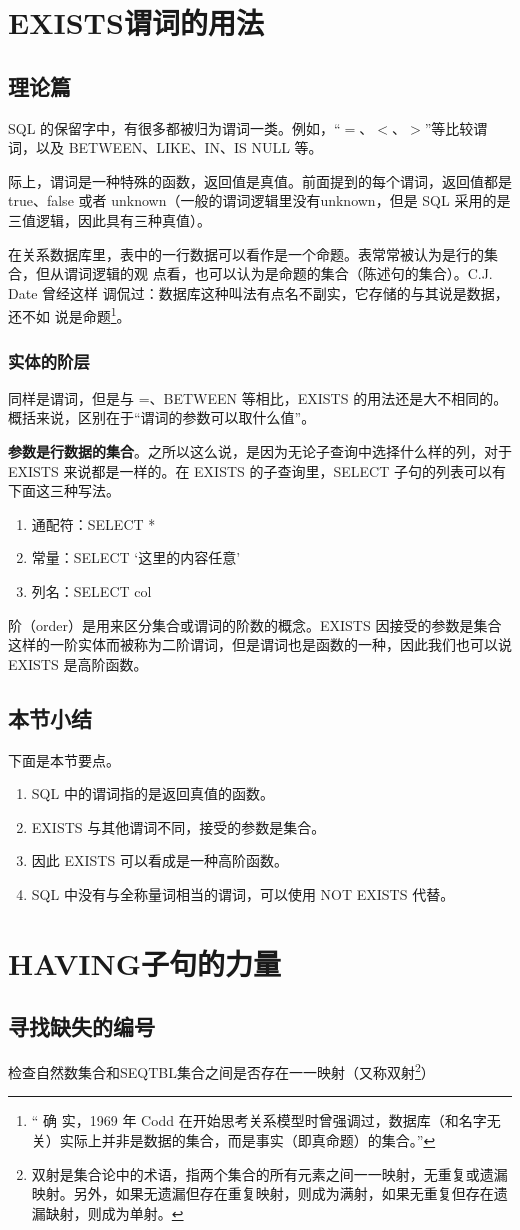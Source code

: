 \section{EXISTS谓词的用法}
\subsection{理论篇}
SQL 的保留字中，有很多都被归为谓词一类。例如，“$=$、$<$、$>$”等比较谓词，以及 BETWEEN、LIKE、IN、IS NULL 等。

际上，谓词是一种特殊的函数，返回值是真值。前面提到的每个谓词，返回值都是 true、false 或者 unknown（一般的谓词逻辑里没有unknown，但是 SQL 采用的是三值逻辑，因此具有三种真值）。

在关系数据库里，表中的一行数据可以看作是一个命题。表常常被认为是行的集合，但从谓词逻辑的观
点看，也可以认为是命题的集合（陈述句的集合）。C.J. Date 曾经这样
调侃过：数据库这种叫法有点名不副实，它存储的与其说是数据，还不如
说是命题\footnote{“ 确 实，1969 年 Codd 在开始思考关系模型时曾强调过，数据库（和名字无关）实际上并非是数据的集合，而是事实（即真命题）的集合。”}。
\subsubsection*{实体的阶层}
同样是谓词，但是与 =、BETWEEN 等相比，EXISTS 的用法还是大不相同的。概括来说，区别在于“谓词的参数可以取什么值”。


\textbf{参数是行数据的集合}。之所以这么说，是因为无论子查询中选择什么样的列，对于 EXISTS 来说都是一样的。在 EXISTS 的子查询里，SELECT 子句的列表可以有下面这三种写法。
\begin{enumerate}
    \item 通配符：SELECT *
    \item 常量：SELECT ‘这里的内容任意’
    \item 列名：SELECT col
\end{enumerate}


阶（order）是用来区分集合或谓词的阶数的概念。EXISTS 因接受的参数是集合这样的一阶实体而被称为二阶谓词，但是谓词也是函数的一种，因此我们也可以说EXISTS 是高阶函数。


\subsection{本节小结}
下面是本节要点。
\begin{enumerate}
    \item SQL 中的谓词指的是返回真值的函数。
    \item EXISTS 与其他谓词不同，接受的参数是集合。
    \item 因此 EXISTS 可以看成是一种高阶函数。
    \item SQL 中没有与全称量词相当的谓词，可以使用 NOT EXISTS 代替。
\end{enumerate}

\section{HAVING子句的力量}
\subsection{寻找缺失的编号}
检查自然数集合和SEQTBL集合之间是否存在一一映射（又称双射\footnote{双射是集合论中的术语，指两个集合的所有元素之间一一映射，无重复或遗漏映射。另外，如果无遗漏但存在重复映射，则成为满射，如果无重复但存在遗漏缺射，则成为单射。}）